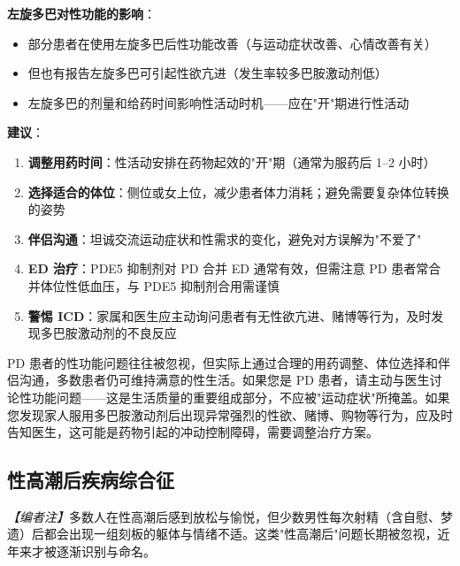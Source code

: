 \documentclass[12pt,a4paper,twoside]{ctexbook}
\begin{document}
\vspace{0.5em}
\noindent\textbf{左旋多巴对性功能的影响}：

\begin{itemize}[leftmargin=2cm]
	\item 部分患者在使用左旋多巴后性功能改善（与运动症状改善、心情改善有关）
	\item 但也有报告左旋多巴可引起性欲亢进（发生率较多巴胺激动剂低）
	\item 左旋多巴的剂量和给药时间影响性活动时机——应在"开"期进行性活动
\end{itemize}

\vspace{0.5em}
\noindent\textbf{建议}：

\begin{enumerate}
	\item \textbf{调整用药时间}：性活动安排在药物起效的"开"期（通常为服药后 1--2 小时）
	\item \textbf{选择适合的体位}：侧位或女上位，减少患者体力消耗；避免需要复杂体位转换的姿势
	\item \textbf{伴侣沟通}：坦诚交流运动症状和性需求的变化，避免对方误解为"不爱了"
	\item \textbf{ED 治疗}：PDE5 抑制剂对 PD 合并 ED 通常有效，但需注意 PD 患者常合并体位性低血压，与 PDE5 抑制剂合用需谨慎
	\item \textbf{警惕 ICD}：家属和医生应主动询问患者有无性欲亢进、赌博等行为，及时发现多巴胺激动剂的不良反应
\end{enumerate}

\begin{tcolorbox}[colback=pink!5!white,colframe=red!50!black,title=贴心小叮咛]
PD 患者的性功能问题往往被忽视，但实际上通过合理的用药调整、体位选择和伴侣沟通，多数患者仍可维持满意的性生活。如果您是 PD 患者，请主动与医生讨论性功能问题——这是生活质量的重要组成部分，不应被"运动症状"所掩盖。如果您发现家人服用多巴胺激动剂后出现异常强烈的性欲、赌博、购物等行为，应及时告知医生，这可能是药物引起的冲动控制障碍，需要调整治疗方案。
\end{tcolorbox}

\subsection{性高潮后疾病综合征}
\label{subsec:pois}

\noindent\textit{【编者注】}多数人在性高潮后感到放松与愉悦，但少数男性每次射精（含自慰、梦遗）后都会出现一组刻板的躯体与情绪不适。这类"性高潮后"问题长期被忽视，近年来才被逐渐识别与命名。
\end{document}
